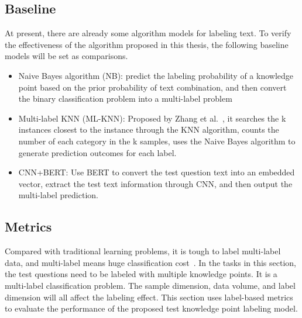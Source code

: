 \subsection{Baseline}
At present, there are already some algorithm models for labeling text. To verify the effectiveness of the algorithm proposed in this thesis, the following baseline models will be set as comparisons.
\begin{itemize}
    \item Naive Bayes algorithm (NB): predict the labeling probability of a knowledge point based on the prior probability of text combination, and then convert the binary classification problem into a multi-label problem
    \item Multi-label KNN (ML-KNN): Proposed by Zhang et al.~\cite{zhang2007ml}, it searches the k instances closest to the instance through the KNN algorithm, counts the number of each category in the k samples, uses the Naive Bayes algorithm to generate prediction outcomes for each label.
    \item CNN+BERT\@: Use BERT to convert the test question text into an embedded vector, extract the test text information through CNN, and then output the multi-label prediction.
\end{itemize}

\subsection{Metrics}
Compared with traditional learning problems, it is tough to label multi-label data, and multi-label means huge classification cost~\cite{zhang2013review}. In the tasks in this section, the test questions need to be labeled with multiple knowledge points. It is a multi-label classification problem. The sample dimension, data volume, and label dimension will all affect the labeling effect. This section uses label-based metrics to evaluate the performance of the proposed test knowledge point labeling model.

